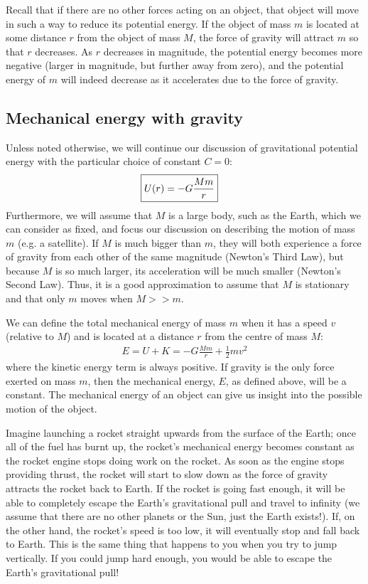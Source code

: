 Recall that if there are no other forces acting on an object, that object will move in such a way to reduce its potential energy. If the object of mass $m$ is located at some distance $r$ from the object of mass $M$, the force of gravity will attract $m$ so that $r$ decreases. As $r$ decreases in magnitude, the potential energy becomes more negative (larger in magnitude, but further away from zero), and the potential energy of $m$ will indeed decrease as it accelerates due to the force of gravity. 

\subsection{Mechanical energy with gravity}
Unless noted otherwise, we will continue our discussion of gravitational potential energy with the particular choice of constant $C=0$:
\begin{align}
\Aboxed{U(r) = -G\frac{Mm}{r}}
\end{align}
Furthermore, we will assume that $M$ is a large body, such as the Earth, which we can consider as fixed, and focus our discussion on describing the motion of mass $m$ (e.g. a satellite). If $M$ is much bigger than $m$, they will both experience a force of gravity from each other of the same magnitude (Newton's Third Law), but because $M$ is so much larger, its acceleration will be much smaller (Newton's Second Law). Thus, it is a good approximation to assume that $M$ is stationary and that only $m$ moves when $M>>m$. 

We can define the total mechanical energy of mass $m$ when it has a speed $v$ (relative to $M$) and is located at a distance $r$ from the centre of mass $M$:
\begin{align*}
E = U + K = -G\frac{Mm}{r}+\frac{1}{2}mv^2
\end{align*}
where the kinetic energy term is always positive. If gravity is the only force exerted on mass $m$, then the mechanical energy, $E$, as defined above, will be a constant. The mechanical energy of an object can give us insight into the possible motion of the object.

Imagine launching a rocket straight upwards from the surface of the Earth; once all of the fuel has burnt up, the rocket's mechanical energy becomes constant as the rocket engine stops doing work on the rocket. As soon as the engine stops providing thrust, the rocket will start to slow down as the force of gravity attracts the rocket back to Earth. If the rocket is going fast enough, it will be able to completely escape the Earth's gravitational pull and travel to infinity (we assume that there are no other planets or the Sun, just the Earth exists!). If, on the other hand, the rocket's speed is too low, it will eventually stop and fall back to Earth. This is the same thing that happens to you when you try to jump vertically. If you could jump hard enough, you would be able to escape the Earth's gravitational pull!

